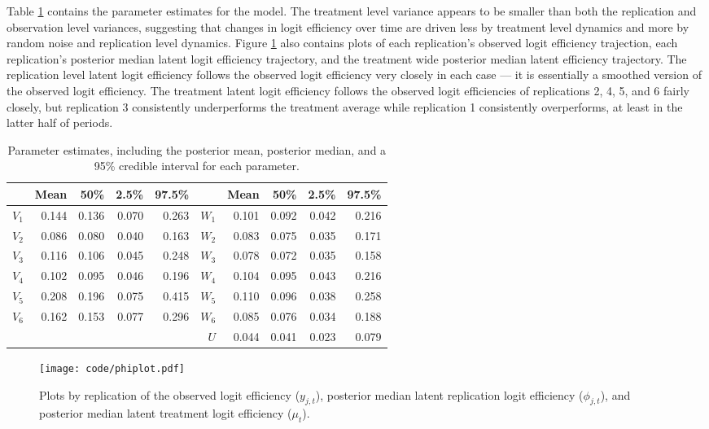 \documentclass[graybox]{svmult}
\begin{document}
Table \ref{tab:parests} contains the parameter estimates for the model. The treatment level variance appears to be smaller than both the replication and observation level variances, suggesting that changes in logit efficiency over time are driven less by treatment level dynamics and more by random noise and replication level dynamics. Figure \ref{fig:phiplot} also contains plots of each replication's observed logit efficiency trajection, each replication's posterior median latent logit efficiency trajectory, and the treatment wide posterior median latent efficiency trajectory. The replication level latent logit efficiency follows the observed logit efficiency very closely in each case --- it is essentially a smoothed version of the observed logit efficiency. The treatment latent logit efficiency follows the observed logit efficiencies of replications 2, 4, 5, and 6 fairly closely, but replication 3 consistently underperforms the treatment average while replication 1 consistently overperforms, at least in the latter half of periods.

\begin{table}[ht]
\centering
\begin{tabular}{rrrrr|rrrrr}
  \hline
 & Mean & 50\% & 2.5\% & 97.5\% && Mean & 50\% & 2.5\% & 97.5\% \\  
  \hline
  $V_1$ & 0.144 & 0.136 & 0.070 & 0.263 & $W_1$ & 0.101 & 0.092 & 0.042 & 0.216 \\ 
  $V_2$ & 0.086 & 0.080 & 0.040 & 0.163 & $W_2$ & 0.083 & 0.075 & 0.035 & 0.171 \\ 
  $V_3$ & 0.116 & 0.106 & 0.045 & 0.248 & $W_3$ & 0.078 & 0.072 & 0.035 & 0.158 \\ 
  $V_4$ & 0.102 & 0.095 & 0.046 & 0.196 & $W_4$ & 0.104 & 0.095 & 0.043 & 0.216 \\  
  $V_5$ & 0.208 & 0.196 & 0.075 & 0.415 & $W_5$ & 0.110 & 0.096 & 0.038 & 0.258 \\ 
  $V_6$ & 0.162 & 0.153 & 0.077 & 0.296 & $W_6$ & 0.085 & 0.076 & 0.034 & 0.188 \\ 
  &&&&& $U$ & 0.044 & 0.041 & 0.023 & 0.079 \\  
   \hline
\end{tabular}
\label{tab:parests}
\caption{Parameter estimates, including the posterior mean, posterior median, and a 95\% credible interval for each parameter.}
\end{table}

\begin{figure}[h]
\centering
\texttt{[image: code/phiplot.pdf]}
\label{fig:phiplot}
\caption{Plots by replication of the observed logit efficiency ($y_{j,t}$), posterior median latent replication logit efficiency ($\phi_{j,t}$), and posterior median latent treatment logit efficiency ($\mu_t$).}
\end{figure}
\end{document}
